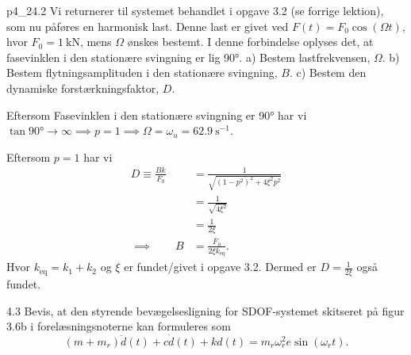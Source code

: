 

\begin{problemwithimage}{p4_2}{4.2}
    Vi returnerer til systemet behandlet i opgave 3.2 (se forrige lektion), som nu påføres en harmonisk last.
  Denne last er givet ved $F(t) = F_0 \cos \left( \Omega t \right)$, hvor $F_0 = \qty{1}{\kN}$, mens $\Omega$ ønskes bestemt. I denne forbindelse oplyses det, at fasevinklen i den stationære svingning er lig \ang{90}.
  a) Bestem lastfrekvensen, $\Omega$.
  b) Bestem flytningsamplituden i den stationære svingning, $B$.
  c) Bestem den dynamiske forstærkningsfaktor, $D$.
\end{problemwithimage}

\begin{derivation}
  Eftersom Fasevinklen i den stationære svingning er \ang{90} har vi $\tan \ang{90} \to \infty \implies p = 1 \implies \Omega = \omega_u = \qty{62,9}{\s^{-1}}$.

  Eftersom $p = 1$ har vi
  \begin{align*}
    D \equiv \frac{Bk}{F_0} &= \frac{1}{\sqrt{\left( 1 - p^2 \right)^2 + 4 \xi^2 p^2}} \\
                            &= \frac{1}{\sqrt{4 \xi^2}} \\
                            &= \frac{1}{2\xi} \\
    \implies \qquad B &= \frac{F_0}{2 \xi k_{\mathrm{eq}}}
  .\end{align*}
  Hvor $k_{\mathrm{eq}} = k_1 + k_2$ og $\xi$ er fundet/givet i opgave 3.2. Dermed er $D = \frac{1}{2\xi}$ også fundet.
\end{derivation}



\begin{problem}{4.3}
  Bevis, at den styrende bevægelsesligning for SDOF-systemet skitseret på figur 3.6b i forelæsningsnoterne kan formuleres som
  \[ 
  \left( m + m_r \right) \ddot{d} (t) + c \dot{d}(t) + k d( t) = m_r \omega_r^2 e \sin \left( \omega_r t \right)
  .\]
\end{problem}

